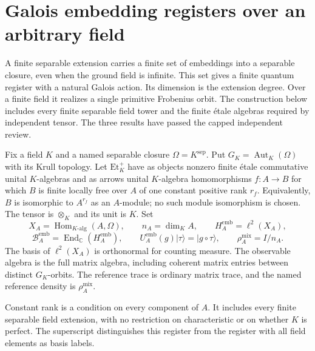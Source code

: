 \section{Galois embedding registers over an arbitrary field}
\label{sec:galois-embedding-registers}

A finite separable extension carries a finite set of embeddings into a
separable closure, even when the ground field is infinite. This set gives
a finite quantum register with a natural Galois action. Its dimension is
the extension degree. Over a finite field it realizes a single primitive
Frobenius orbit. The construction below includes every finite separable
field tower and the finite \'etale algebras required by independent tensor.
The three results have passed the capped independent review.

\begin{definition}
Fix a field $K$ and a named separable closure $\Omega=K^{\mathrm{sep}}$.
Put $G_K=\operatorname{Aut}_K(\Omega)$ with its Krull topology. Let
$\mathrm{Et}_K^+$ have as objects nonzero finite \'etale commutative unital
$K$-algebras and as arrows unital $K$-algebra homomorphisms $f:A\to B$
for which $B$ is finite locally free over $A$ of one constant positive
rank $r_f$. Equivalently, $B$ is isomorphic to $A^{r_f}$ as an $A$-module;
no such module isomorphism is chosen. The tensor is $\otimes_K$ and its
unit is $K$. Set
\[
 X_A=\operatorname{Hom}_{K\text{-alg}}(A,\Omega),\qquad
 n_A=\dim_K A,\qquad H_A^{\mathrm{emb}}=\ell^2(X_A),
\]
\[
 \mathcal B_A^{\mathrm{emb}}=\operatorname{End}_{\mathbb C}
       (H_A^{\mathrm{emb}}),\qquad
 U_A^{\mathrm{emb}}(g)|\tau\rangle=|g\circ\tau\rangle,\qquad
 \rho_A^{\mathrm{mix}}=I/n_A.
\]
The basis of $\ell^2(X_A)$ is orthonormal for counting measure. The
observable algebra is the full matrix algebra, including coherent matrix
entries between distinct $G_K$-orbits. The reference trace is ordinary
matrix trace, and the named reference density is $\rho_A^{\mathrm{mix}}$.
\end{definition}
\begin{scope}
Constant rank is a condition on every component of $A$. It includes every
finite separable field extension, with no restriction on characteristic or
on whether $K$ is perfect. The superscript distinguishes this register
from the register with all field elements as basis labels.
\end{scope}

